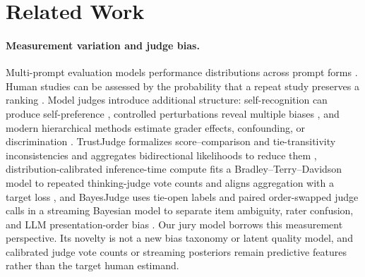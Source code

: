 \documentclass{article}
\begin{document}

\section{Related Work}
\label{sec:related}

\paragraph{Measurement variation and judge bias.}
Multi-prompt evaluation models performance distributions across prompt forms
\cite{polo2024multiprompt}. Human studies can be assessed by the probability
that a repeat study preserves a ranking \cite{riley2024replicable}. Model
judges introduce additional structure: self-recognition can produce
self-preference \cite{panickssery2024evaluators}, controlled perturbations
reveal multiple biases \cite{ye2025justice}, and modern hierarchical methods
estimate grader effects, confounding, or discrimination
\cite{dubois2026biases,zhao2026care,qian2026jury,xu2026judgeaware}. TrustJudge formalizes
score--comparison and tie-transitivity inconsistencies and aggregates
bidirectional likelihoods to reduce them \cite{wang2026trustjudge},
distribution-calibrated inference-time compute fits a Bradley--Terry--Davidson
model to repeated thinking-judge vote counts and aligns aggregation with a
target loss \cite{dadkhahi2026calibrated}, and BayesJudge uses tie-open labels
and paired order-swapped judge calls in a streaming Bayesian model to separate
item ambiguity, rater confusion, and LLM presentation-order bias
\cite{zhang2026bayesjudge}. Our jury model borrows this
measurement perspective. Its novelty is not a new bias taxonomy or latent
quality model, and calibrated judge vote counts or streaming posteriors remain
predictive features rather than the target human estimand.
\end{document}
